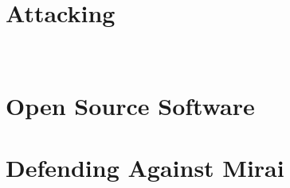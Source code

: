 \documentclass{beamer}
\begin{document}
\section{Attacking}

\

\section{Open Source Software}

\section{Defending Against Mirai}
\end{document}
